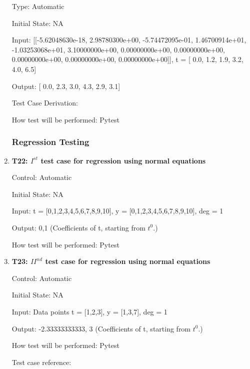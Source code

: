 \documentclass[12pt, titlepage]{article}
\begin{document}
\begin{enumerate}
Type: Automatic

Initial State: NA 

Input: [[-5.62048630e-18, 2.98780300e+00, -5.74472095e-01,  1.46700914e+01,
-1.03253068e+01,  3.10000000e+00,  0.00000000e+00,  0.00000000e+00,
0.00000000e+00,  0.00000000e+00,  0.00000000e+00]], t = [ 0.0, 1.2,  1.9,  
3.2,  4.0,  6.5] 

Output: [ 0.0,  2.3,  3.0,  4.3,  2.9,  3.1]

Test Case Derivation: \cite{BSpline}

How test will be performed: Pytest







\subsubsection{Regression Testing}\label{ResgressionTesting}



\item{\textbf{T22: $I^{st}$ test case for regression using normal equations} \\}

Control: Automatic

Initial State: NA

Input: t = [0,1,2,3,4,5,6,7,8,9,10], y = [0,1,2,3,4,5,6,7,8,9,10], deg = 1 

Output: 0,1 (Coefficients of t, starting from $t^{0}$.)

How test will be performed: Pytest\\


\item{\textbf{T23: ${II}^{nd}$ test case for regression using normal 
equations}\\}

Control: Automatic

Initial State: NA

Input: Data points t = [1,2,3], y = [1,3,7], deg = 1

Output: -2.33333333333, 3 (Coefficients of t, starting from $t^{0}$.)

How test will be performed: Pytest

Test case reference: ~\cite{RegNormal}\\


\end{enumerate}
\end{document}
